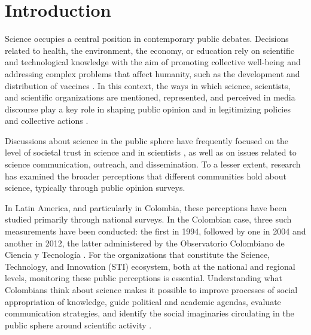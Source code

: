 \documentclass[pdflatex,sn-mathphys-num, iicol]{sn-jnl}
\begin{document}
	\maketitle
	
	\section{Introduction}\label{sec:intro}
	
	Science occupies a central position in contemporary public debates. Decisions related to health, the environment, the economy, or education rely on scientific and technological knowledge with the aim of promoting collective well-being and addressing complex problems that affect humanity, such as the development and distribution of vaccines \cite{Chakravartty2022}. In this context, the ways in which science, scientists, and scientific organizations are mentioned, represented, and perceived in media discourse play a key role in shaping public opinion and in legitimizing policies and collective actions \cite{Mede2022}.
	
	Discussions about science in the public sphere have frequently focused on the level of societal trust in science and in scientists \cite{Cologna2025, Sturgis2021, Mede2022}, as well as on issues related to science communication, outreach, and dissemination. To a lesser extent, research has examined the broader perceptions that different communities hold about science, typically through public opinion surveys.
	
	In Latin America, and particularly in Colombia, these perceptions have been studied primarily through national surveys. In the Colombian case, three such measurements have been conducted: the first in 1994, followed by one in 2004 and another in 2012, the latter administered by the Observatorio Colombiano de Ciencia y Tecnolog{\'i}a \cite{Daza_Caicedo2014}. For the organizations that constitute the Science, Technology, and Innovation (STI) ecosystem, both at the national and regional levels, monitoring these public perceptions is essential. Understanding what Colombians think about science makes it possible to improve processes of social appropriation of knowledge, guide political and academic agendas, evaluate communication strategies, and identify the social imaginaries circulating in the public sphere around scientific activity \cite{Daza_Caicedo2014}.
	
\end{document}
